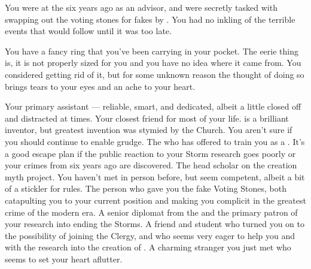 \documentclass[char]{GL2020}
\begin{document}
\begin{itemz}[Notes]
    \item You were at the \pSchool{} six years ago as an advisor, and were secretly tasked with swapping out the voting stones for fakes by \cEvil{}. You had no inkling of the terrible events that would follow until it was too late.
    \item You have a fancy ring that you've been carrying in your pocket. The eerie thing is, it is not properly sized for you and you have no idea where it came from. You considered getting rid of it, but for some unknown reason the thought of doing so brings tears to your eyes and an ache to your heart.
\end{itemz}

\begin{contacts}
    \contact{\cAssistantScientist{}} Your primary assistant — reliable, smart, and dedicated, albeit a little closed off and distracted at times.
    \contact{\cChupInventor{}} Your closest friend for most of your life. \cChupInventor{} is a brilliant inventor, but \cChupInventor{\their} greatest invention was stymied by the Church. You aren't sure if you should continue to enable \cChupInventor{\their} grudge.
    \contact{\cBeetle{}} The \cBeetle{\cleric} who has offered to train you as a \cHeadScientist{\cleric}. It's a good escape plan if the public reaction to your Storm research goes poorly or your crimes from six years ago are discovered.
    \contact{\cEbbPriest{}} The head scholar on the creation myth project. You haven't met in person before, but \cEbbPriest{\they} seem\cEbbPriest{\verbs} competent, albeit a bit of a stickler for rules.
    \contact{\cEvil{}} The person who gave you the fake Voting Stones, both catapulting you to your current position and making you complicit in the greatest crime of the modern era. 
    \contact{\cDiplomat{}} A senior diplomat from the \pTech{} and the primary patron of your research into ending the Storms. 
    \contact{\cScholarship{}} A friend and student who turned you on to the possibility of joining the Clergy, and who seems very eager to help you and \cEbbPriest{} with the research into the creation of \pEarth{}.
    \contact{\cChupAvenger{}} A charming stranger you just met who seems to set your heart aflutter.
\end{contacts}
\end{document}
